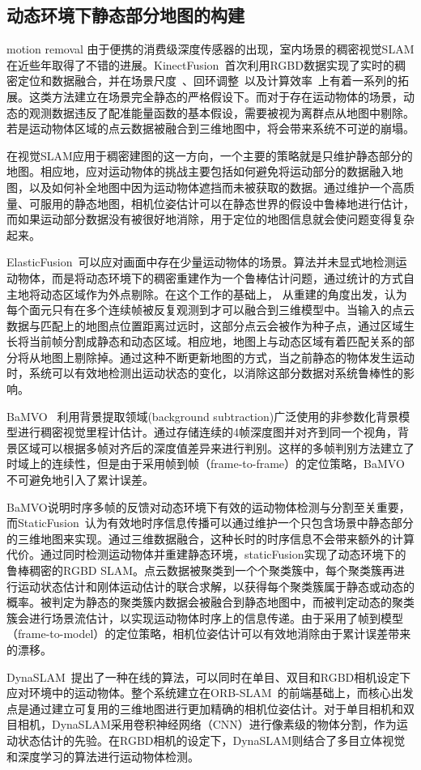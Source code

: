 \subsection{动态环境下静态部分地图的构建} motion removal
\label{subsec:object-centered_mapping}
\newpage
由于便携的消费级深度传感器的出现，室内场景的稠密视觉SLAM在近些年取得了不错的进展。KinectFusion~\cite{kinectFusion}首次利用RGBD数据实现了实时的稠密定位和数据融合，并在场景尺度~\cite{voxelHashing}、回环调整~\cite{kintinuous}以及计算效率~\cite{CPUmapping}上有着一系列的拓展。这类方法建立在场景完全静态的严格假设下。而对于存在运动物体的场景，动态的观测数据违反了配准能量函数的基本假设，需要被视为离群点从地图中剔除。若是运动物体区域的点云数据被融合到三维地图中，将会带来系统不可逆的崩塌。

在视觉SLAM应用于稠密建图的这一方向，一个主要的策略就是只维护静态部分的地图。相应地，应对运动物体的挑战主要包括如何避免将运动部分的数据融入地图，以及如何补全地图中因为运动物体遮挡而未被获取的数据。通过维护一个高质量、可服用的静态地图，相机位姿估计可以在静态世界的假设中鲁棒地进行估计，而如果运动部分数据没有被很好地消除，用于定位的地图信息就会使问题变得复杂起来。

ElasticFusion~\cite{elasticFusion}可以应对画面中存在少量运动物体的场景。算法并未显式地检测运动物体，而是将动态环境下的稠密重建作为一个鲁棒估计问题，通过统计的方式自主地将动态区域作为外点剔除。在这个工作的基础上，\cite{keller13_3dv} 从重建的角度出发，认为每个面元只有在多个连续帧被反复观测到才可以融合到三维模型中。当输入的点云数据与匹配上的地图点位置距离过远时，这部分点云会被作为种子点，通过区域生长将当前帧分割成静态和动态区域。相应地，地图上与动态区域有着匹配关系的部分将从地图上剔除掉。通过这种不断更新地图的方式，当之前静态的物体发生运动时，系统可以有效地检测出运动状态的变化，以消除这部分数据对系统鲁棒性的影响。

BaMVO~\cite{BaMVO} 利用背景提取领域(background subtraction)广泛使用的非参数化背景模型进行稠密视觉里程计估计。通过存储连续的4帧深度图并对齐到同一个视角，背景区域可以根据多帧对齐后的深度值差异来进行判别。这样的多帧判别方法建立了时域上的连续性，但是由于采用帧到帧（frame-to-frame）的定位策略，BaMVO不可避免地引入了累计误差。

BaMVO说明时序多帧的反馈对动态环境下有效的运动物体检测与分割至关重要，而StaticFusion~\cite{staticFusion}认为有效地时序信息传播可以通过维护一个只包含场景中静态部分的三维地图来实现。通过三维数据融合，这种长时的时序信息不会带来额外的计算代价。通过同时检测运动物体并重建静态环境，staticFusion实现了动态环境下的鲁棒稠密的RGBD SLAM。点云数据被聚类到一个个聚类簇中，每个聚类簇再进行运动状态估计和刚体运动估计的联合求解，以获得每个聚类簇属于静态或动态的概率。被判定为静态的聚类簇内数据会被融合到静态地图中，而被判定动态的聚类簇会进行场景流估计，以实现运动物体时序上的信息传递。由于采用了帧到模型（frame-to-model）的定位策略，相机位姿估计可以有效地消除由于累计误差带来的漂移。

DynaSLAM~\cite{DynaSLAM}提出了一种在线的算法，可以同时在单目、双目和RGBD相机设定下应对环境中的运动物体。整个系统建立在ORB-SLAM~\cite{orbslam2}的前端基础上，而核心出发点是通过建立可复用的三维地图进行更加精确的相机位姿估计。对于单目相机和双目相机，DynaSLAM采用卷积神经网络（CNN）进行像素级的物体分割，作为运动状态估计的先验。在RGBD相机的设定下，DynaSLAM则结合了多目立体视觉和深度学习的算法进行运动物体检测。


